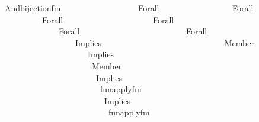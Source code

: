 \begin{isabellebody}
\ \ \ \ \ \ \ \ \ \ And{\isacharparenleft}{\kern0pt}bijection{\isacharunderscore}{\kern0pt}fm{\isacharparenleft}{\kern0pt}{}{\isacharcomma}{\kern0pt}\ {}{\isacharcomma}{\kern0pt}\ {}{\isacharparenright}{\kern0pt}{\isacharcomma}{\kern0pt}\isanewline
\ \ \ \ \ \ \ \ \ \ \ \ \ \ \ \ Forall\isanewline
\ \ \ \ \ \ \ \ \ \ \ \ \ \ \ \ \ {\isacharparenleft}{\kern0pt}Forall\isanewline
\ \ \ \ \ \ \ \ \ \ \ \ \ \ \ \ \ \ \ {\isacharparenleft}{\kern0pt}Forall\isanewline
\ \ \ \ \ \ \ \ \ \ \ \ \ \ \ \ \ \ \ \ \ {\isacharparenleft}{\kern0pt}Forall\isanewline
\ \ \ \ \ \ \ \ \ \ \ \ \ \ \ \ \ \ \ \ \ \ \ {\isacharparenleft}{\kern0pt}Forall\isanewline
\ \ \ \ \ \ \ \ \ \ \ \ \ \ \ \ \ \ \ \ \ \ \ \ \ {\isacharparenleft}{\kern0pt}Forall\isanewline
\ \ \ \ \ \ \ \ \ \ \ \ \ \ \ \ \ \ \ \ \ \ \ \ \ \ \ {\isacharparenleft}{\kern0pt}Implies\isanewline
\ \ \ \ \ \ \ \ \ \ \ \ \ \ \ \ \ \ \ \ \ \ \ \ \ \ \ \ \ {\isacharparenleft}{\kern0pt}Member{\isacharparenleft}{\kern0pt}{}{\isacharcomma}{\kern0pt}\ {}{\isacharparenright}{\kern0pt}{\isacharcomma}{\kern0pt}\isanewline
\ \ \ \ \ \ \ \ \ \ \ \ \ \ \ \ \ \ \ \ \ \ \ \ \ \ \ \ \ \ Implies\isanewline
\ \ \ \ \ \ \ \ \ \ \ \ \ \ \ \ \ \ \ \ \ \ \ \ \ \ \ \ \ \ \ {\isacharparenleft}{\kern0pt}Member{\isacharparenleft}{\kern0pt}{}{\isacharcomma}{\kern0pt}\ {}{\isacharparenright}{\kern0pt}{\isacharcomma}{\kern0pt}\isanewline
\ \ \ \ \ \ \ \ \ \ \ \ \ \ \ \ \ \ \ \ \ \ \ \ \ \ \ \ \ \ \ \ Implies\isanewline
\ \ \ \ \ \ \ \ \ \ \ \ \ \ \ \ \ \ \ \ \ \ \ \ \ \ \ \ \ \ \ \ \ {\isacharparenleft}{\kern0pt}fun{\isacharunderscore}{\kern0pt}apply{\isacharunderscore}{\kern0pt}fm{\isacharparenleft}{\kern0pt}{}{\isacharcomma}{\kern0pt}\ {}{\isacharcomma}{\kern0pt}\ {}{\isacharparenright}{\kern0pt}{\isacharcomma}{\kern0pt}\isanewline
\ \ \ \ \ \ \ \ \ \ \ \ \ \ \ \ \ \ \ \ \ \ \ \ \ \ \ \ \ \ \ \ \ \ Implies\isanewline
\ \ \ \ \ \ \ \ \ \ \ \ \ \ \ \ \ \ \ \ \ \ \ \ \ \ \ \ \ \ \ \ \ \ \ {\isacharparenleft}{\kern0pt}fun{\isacharunderscore}{\kern0pt}apply{\isacharunderscore}{\kern0pt}fm{\isacharparenleft}{\kern0pt}{}{\isacharcomma}{\kern0pt}\ {}{\isacharcomma}{\kern0pt}\ {}{\isacharparenright}{\kern0pt}{\isacharcomma}{\kern0pt}\isanewline

\end{isabellebody}
